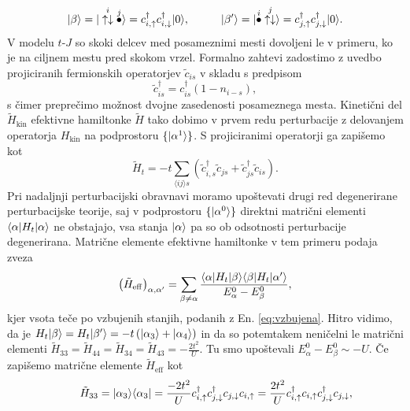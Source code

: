 {\begin{appendices}
\begin{equation}
\ket{\beta}=\ket{ \overset{i}{\uparrow\downarrow}\overset{j}{\bullet}}=c^\dagger_{i,\uparrow}c^\dagger_{i,\downarrow}\ket{0}, \hspace{10mm} 
\ket{\beta'}=\ket{\overset{i}{\bullet}\overset{j}{\uparrow\downarrow}}=c^\dagger_{j,\uparrow}c^\dagger_{j,\downarrow}\ket{0}.
\end{equation}
 V modelu $t$-$J$ so skoki delcev med posameznimi mesti dovoljeni le v primeru, ko je na ciljnem mestu pred skokom vrzel. Formalno zahtevi zadostimo z uvedbo projiciranih fermionskih operatorjev $\tilde{c}_{is}$ v skladu s predpisom 
\begin{equation}\label{eq:projicirani}
\tilde{c}^\dagger_{is}= c^\dagger_{is} \left(1-n_{i-s}\right),
\end{equation}
s čimer preprečimo možnost dvojne zasedenosti posameznega mesta. Kinetični del $\tilde{H}_\mathrm{kin}$ efektivne hamiltonke $\tilde{H}$ tako dobimo v prvem redu perturbacije z delovanjem operatorja $H_\mathrm{kin}$ na podprostoru $\{ \vert\alpha^1\rangle \}$. S projiciranimi operatorji ga zapišemo kot 
\begin{equation}\label{eq:ef_kin}
\tilde{H}_t=-t\sum\limits_{\langle ij \rangle s} \left(\tilde{c}^\dagger_{i,s} \tilde{c}_{js} + \tilde{c}^\dagger_{js}\tilde{c}_{is}\right).
\end{equation}
Pri nadaljnji perturbacijski obravnavi moramo upoštevati drugi red degenerirane perturbacijske teorije, saj v podprostoru $\{ \vert\alpha^0\rangle\}$ direktni matrični elementi $\langle \alpha \vert H_t \vert\alpha\rangle$ ne obstajajo, vsa stanja $\vert\alpha\rangle$ pa so ob odsotnosti perturbacije degenerirana. 
Matrične elemente efektivne hamiltonke v tem primeru podaja zveza 
\begin{equation}
\left(\tilde{H}_\mathrm{eff}\right)_{\alpha, \alpha'}=\sum\limits_{\beta\neq\alpha}\frac{\langle \alpha \vert H_t\vert\beta\rangle\langle \beta \vert H_t\vert\alpha'\rangle}{E_\alpha^0 - E_\beta^0},
\end{equation}
kjer vsota teče po vzbujenih stanjih, podanih z En. \eqref{eq:vzbujena}. Hitro vidimo, da je 
$H_t\vert\beta\rangle=H_t\vert\beta'\rangle=-t\left(\vert\alpha_3\rangle+ \vert\alpha_4\rangle\right)$ in da so potemtakem neničelni le matrični elementi $\tilde{H}_{33}=\tilde{H}_{44}=\tilde{H}_{34}=\tilde{H}_{43}=-\frac{2t^2}{U}$. Tu smo upoštevali $E_\alpha^0- E_\beta^0 \sim -U$. Če zapišemo matrične elemente $\tilde{H}_\mathrm{eff}$ kot
\begin{equation}
\begin{aligned}\qquad
&\tilde{H}_{33}=\ket{\alpha_3}\bra{\alpha_3}=\frac{-2t^2}{U} c^\dagger_{i,\uparrow}c^\dagger_{j,\downarrow}c_{j,\downarrow}c_{i,\uparrow}= \frac{2t^2}{U}c^\dagger_{i,\uparrow}c_{i,\uparrow}c^\dagger_{j,\downarrow}c_{j,\downarrow},\\

\end{aligned}
\end{equation}
\end{appendices}}
